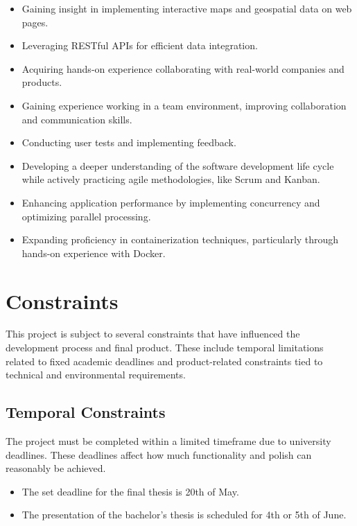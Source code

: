 \begin{itemize}
    \item Gaining insight in implementing interactive maps and geospatial data on web pages.
    \item Leveraging RESTful APIs for efficient data integration.
    \item Acquiring hands-on experience collaborating with real-world companies and products.
    \item Gaining experience working in a team environment, improving collaboration and communication skills.
    \item Conducting user tests and implementing feedback. 
    \item Developing a deeper understanding of the software development life cycle while actively practicing agile methodologies, like Scrum and Kanban.
    \item Enhancing application performance by implementing concurrency and optimizing parallel processing.
    \item Expanding proficiency in containerization techniques, particularly through hands-on experience with Docker.
\end{itemize}

\section{Constraints}

This project is subject to several constraints that have influenced the development process and final product. These include temporal limitations related to fixed academic deadlines and product-related constraints tied to technical and environmental requirements.

\subsection{Temporal Constraints}

The project must be completed within a limited timeframe due to university deadlines. These deadlines affect how much functionality and polish can reasonably be achieved.

\begin{itemize}
    \item The set deadline for the final thesis is 20th of May.
    \item The presentation of the bachelor's thesis is scheduled for 4th or 5th of June.
\end{itemize}

